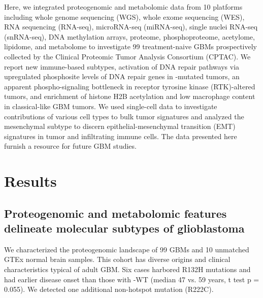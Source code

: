 Here, we integrated proteogenomic and metabolomic data from 10 platforms including whole genome sequencing (WGS), whole exome sequencing (WES), RNA sequencing (RNA-seq), microRNA-seq (miRNA-seq), single nuclei RNA-seq (snRNA-seq), DNA methylation arrays, proteome, phosphoproteome, acetylome, lipidome, and metabolome to investigate 99 treatment-naive GBMs prospectively collected by the Clinical Proteomic Tumor Analysis Consortium (CPTAC). We report new immune-based subtypes, activation of DNA repair pathways via upregulated phosphosite levels of DNA repair genes in -mutated tumors, an apparent phospho-signaling bottleneck in receptor tyrosine kinase (RTK)-altered tumors, and enrichment of histone H2B acetylation and low macrophage content in classical-like GBM tumors. We used single-cell data to investigate contributions of various cell types to bulk tumor signatures and analyzed the mesenchymal subtype to discern epithelial-mesenchymal transition (EMT) signatures in tumor and infiltrating immune cells. The data presented here furnish a resource for future GBM studies.


\section{Results}

\subsection{Proteogenomic and metabolomic features delineate molecular subtypes of glioblastoma}
We characterized the proteogenomic landscape of 99 GBMs and 10 unmatched GTEx normal brain samples. This cohort has diverse origins and clinical characteristics typical of adult GBM. Six cases harbored  R132H mutations and had earlier disease onset than those with -WT (median 47 vs. 59 years, t test p = 0.055). We detected one additional non-hotspot  mutation (R222C).

